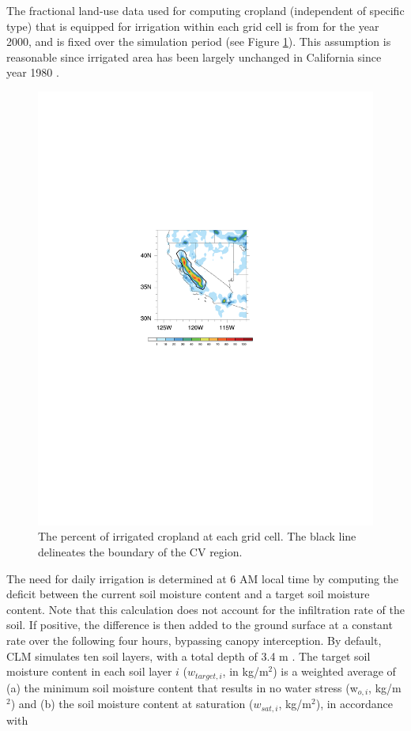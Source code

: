 The fractional land-use data used for computing cropland (independent of specific type) that is equipped for irrigation within each grid cell is from \cite{siebert2005development} for the year 2000, and is fixed over the simulation period (see Figure \ref{fig:Figure 2}). This assumption is reasonable since irrigated area has been largely unchanged in California since year 1980 \cite{bonfils2007empirical}. 

\begin{figure}
\begin{center}
\includegraphics[width=6in]{irrigatedArea.pdf}
\caption{The percent of irrigated cropland at each grid cell.  The black line delineates the boundary of the CV region.}
\label{fig:Figure 2}
\end{center}
\end{figure}

The need for daily irrigation is determined at 6 AM local time by computing the deficit between the current soil moisture content and a target soil moisture content.  Note that this calculation does not account for the infiltration rate of the soil. If positive, the difference is then added to the ground surface at a constant rate over the following four hours, bypassing canopy interception. By default, CLM simulates ten soil layers, with a total depth of 3.4 m \cite{CLM40Tech}. The target soil moisture content in each soil layer $i$ ($w_{target, i}$, in kg/m$^2$) is a weighted average of (a) the minimum soil moisture content that results in no water stress (w$_{o,i}$, kg/m$^2$) and (b) the soil moisture content at saturation ($w_{sat,i}$, kg/m$^2$), in accordance with

